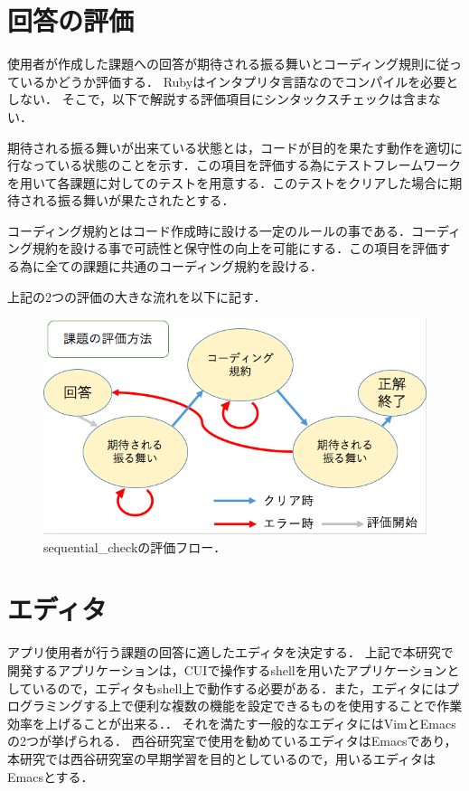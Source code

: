 \section{回答の評価}\label{evaluation}
使用者が作成した課題への回答が期待される振る舞いとコーディング規則に従っているかどうか評価する．
Rubyはインタプリタ言語なのでコンパイルを必要としない．
そこで，以下で解説する評価項目にシンタックスチェックは含まない．
\begin{description}
\def\labelenumi{\arabic{enumi}.}
\tightlist
\item[期待される振る舞い] 期待される振る舞いが出来ている状態とは，コードが目的を果たす動作を適切に行なっている状態のことを示す．この項目を評価する為にテストフレームワークを用いて各課題に対してのテストを用意する．このテストをクリアした場合に期待される振る舞いが果たされたとする．
\item[コーディング規約] コーディング規約とはコード作成時に設ける一定のルールの事である．コーディング規約を設ける事で可読性と保守性の向上を可能にする．この項目を評価する為に全ての課題に共通のコーディング規約を設ける．
\end{description}
上記の2つの評価の大きな流れを以下に記す．
\begin{figure}[H]
\centering
\begin{center}
\includegraphics[width=150mm]{../../picture/seq_flow.png}
\end{center}
\caption{sequential\_checkの評価フロー．\label{seq_flow}}
\end{figure}

\section{エディタ}\label{editor}
アプリ使用者が行う課題の回答に適したエディタを決定する．
上記で本研究で開発するアプリケーションは，CUIで操作するshellを用いたアプリケーションとしているので，エディタもshell上で動作する必要がある．また，エディタにはプログラミングする上で便利な複数の機能を設定できるものを使用することで作業効率を上げることが出来る．．
それを満たす一般的なエディタにはVim\cite{Vim}とEmacs\cite{Emacs}の2つが挙げられる．
西谷研究室で使用を勧めているエディタはEmacsであり，本研究では西谷研究室の早期学習を目的としているので，用いるエディタはEmacsとする．

